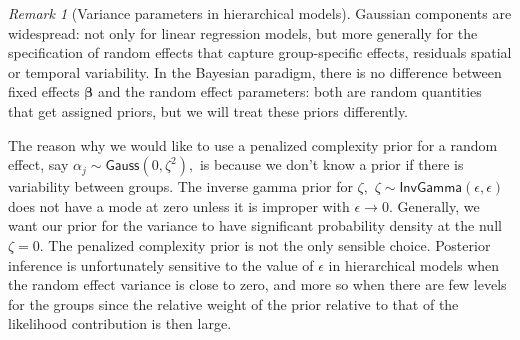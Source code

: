 \documentclass[
  11pt,
  letterpaper,
]{scrbook}
\theoremstyle{definition}
\theoremstyle{plain}
\theoremstyle{plain}
\theoremstyle{plain}
\theoremstyle{definition}
\theoremstyle{definition}
\theoremstyle{plain}
\theoremstyle{plain}
\theoremstyle{remark}
\newtheorem{refremark}{Remark}[chapter]
\begin{document}
\begin{refremark}[Variance parameters in hierarchical models]
Gaussian components are widespread: not only for linear regression
models, but more generally for the specification of random effects that
capture group-specific effects, residuals spatial or temporal
variability. In the Bayesian paradigm, there is no difference between
fixed effects \(\boldsymbol{\beta}\) and the random effect parameters:
both are random quantities that get assigned priors, but we will treat
these priors differently.

The reason why we would like to use a penalized complexity prior for a
random effect, say \(\alpha_j \sim \mathsf{Gauss}(0, \zeta^2),\) is
because we don't know a prior if there is variability between groups.
The inverse gamma prior for \(\zeta,\)
\(\zeta \sim \mathsf{InvGamma}(\epsilon, \epsilon)\) does not have a
mode at zero unless it is improper with \(\epsilon \to 0.\) Generally,
we want our prior for the variance to have significant probability
density at the null \(\zeta=0.\) The penalized complexity prior is not
the only sensible choice. Posterior inference is unfortunately sensitive
to the value of \(\epsilon\) in hierarchical models when the random
effect variance is close to zero, and more so when there are few levels
for the groups since the relative weight of the prior relative to that
of the likelihood contribution is then large.

\label{rem-raneff}

\end{refremark}
\end{document}
